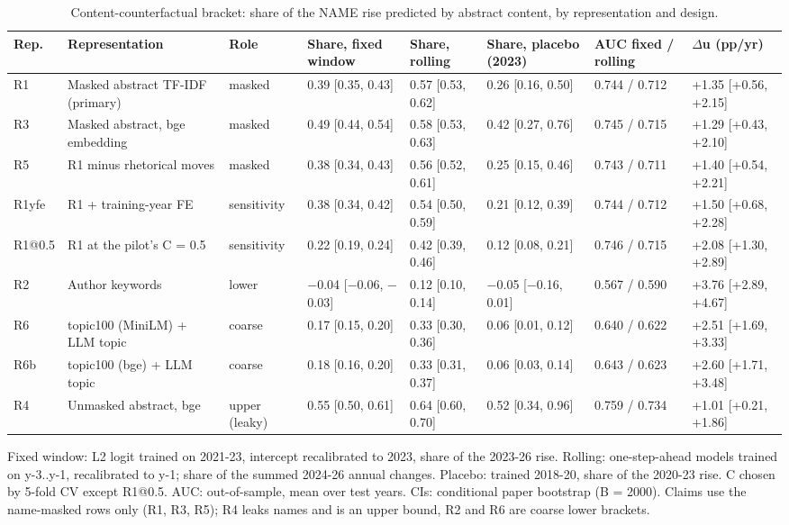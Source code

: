 \begin{table}[t]
\centering
\scriptsize
\caption{Content-counterfactual bracket: share of the NAME rise predicted by abstract content, by representation and design.}
\label{tab:content}
\begin{tabular}{l l l l l l l l}
\toprule
Rep. & Representation & Role & Share, fixed window & Share, rolling & Share, placebo (2023) & AUC fixed / rolling & $\Delta$u (pp/yr) \\
\midrule
R1 & Masked abstract TF-IDF (primary) & masked & 0.39 [0.35, 0.43] & 0.57 [0.53, 0.62] & 0.26 [0.16, 0.50] & 0.744 / 0.712 & +1.35 [+0.56, +2.15] \\
R3 & Masked abstract, bge embedding & masked & 0.49 [0.44, 0.54] & 0.58 [0.53, 0.63] & 0.42 [0.27, 0.76] & 0.745 / 0.715 & +1.29 [+0.43, +2.10] \\
R5 & R1 minus rhetorical moves & masked & 0.38 [0.34, 0.43] & 0.56 [0.52, 0.61] & 0.25 [0.15, 0.46] & 0.743 / 0.711 & +1.40 [+0.54, +2.21] \\
R1yfe & R1 + training-year FE & sensitivity & 0.38 [0.34, 0.42] & 0.54 [0.50, 0.59] & 0.21 [0.12, 0.39] & 0.744 / 0.712 & +1.50 [+0.68, +2.28] \\
R1@0.5 & R1 at the pilot's C = 0.5 & sensitivity & 0.22 [0.19, 0.24] & 0.42 [0.39, 0.46] & 0.12 [0.08, 0.21] & 0.746 / 0.715 & +2.08 [+1.30, +2.89] \\
R2 & Author keywords & lower & $-$0.04 [$-$0.06, $-$0.03] & 0.12 [0.10, 0.14] & $-$0.05 [$-$0.16, 0.01] & 0.567 / 0.590 & +3.76 [+2.89, +4.67] \\
R6 & topic100 (MiniLM) + LLM topic & coarse & 0.17 [0.15, 0.20] & 0.33 [0.30, 0.36] & 0.06 [0.01, 0.12] & 0.640 / 0.622 & +2.51 [+1.69, +3.33] \\
R6b & topic100 (bge) + LLM topic & coarse & 0.18 [0.16, 0.20] & 0.33 [0.31, 0.37] & 0.06 [0.03, 0.14] & 0.643 / 0.623 & +2.60 [+1.71, +3.48] \\
R4 & Unmasked abstract, bge & upper (leaky) & 0.55 [0.50, 0.61] & 0.64 [0.60, 0.70] & 0.52 [0.34, 0.96] & 0.759 / 0.734 & +1.01 [+0.21, +1.86] \\
\bottomrule
\end{tabular}
\par\smallskip
\parbox{\linewidth}{\scriptsize Fixed window: L2 logit trained on 2021-23, intercept recalibrated to 2023, share of the 2023-26 rise. Rolling: one-step-ahead models trained on y-3..y-1, recalibrated to y-1; share of the summed 2024-26 annual changes. Placebo: trained 2018-20, share of the 2020-23 rise. C chosen by 5-fold CV except R1@0.5. AUC: out-of-sample, mean over test years. CIs: conditional paper bootstrap (B = 2000). Claims use the name-masked rows only (R1, R3, R5); R4 leaks names and is an upper bound, R2 and R6 are coarse lower brackets.}
\end{table}
